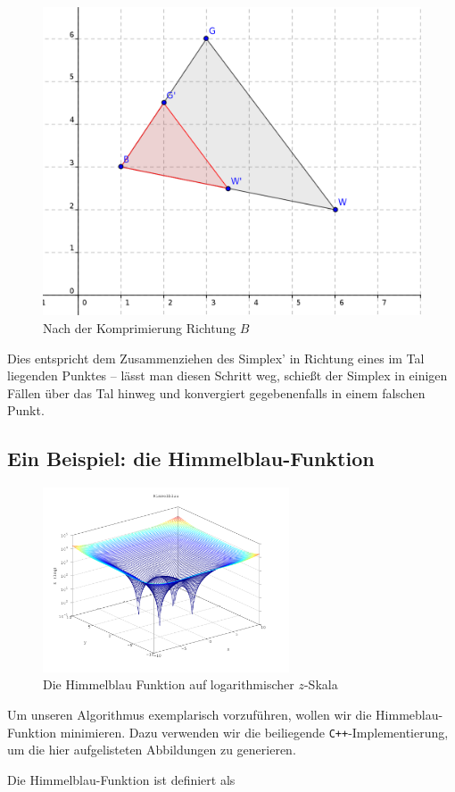 \documentclass[naustrian]{article}
\begin{document}
{\begin{figure}[h]
    \centering
    \includegraphics[width=.5\textwidth]{nelder_mead/triangle_compress}
    \caption{Nach der Komprimierung Richtung $B$}
\end{figure}

Dies entspricht dem Zusammenziehen des Simplex' in Richtung eines im Tal
liegenden Punktes -- lässt man diesen Schritt weg, schießt der Simplex
in einigen Fällen über das Tal hinweg und konvergiert gegebenenfalls
in einem falschen Punkt.

\subsection{Ein Beispiel: die Himmelblau-Funktion}

\begin{figure}[h]
    \centering
    \includegraphics[width=0.65\textwidth]{nelder_mead/himmelblau}
    \caption{Die Himmelblau Funktion auf logarithmischer $z$-Skala}
\end{figure}

Um unseren Algorithmus exemplarisch vorzuführen, wollen wir die Himmeblau-
Funktion minimieren. Dazu verwenden wir die beiliegende {\tt C++}-Implementierung, um
die hier aufgelisteten Abbildungen zu generieren.

Die Himmelblau-Funktion ist definiert als

}
\end{document}
